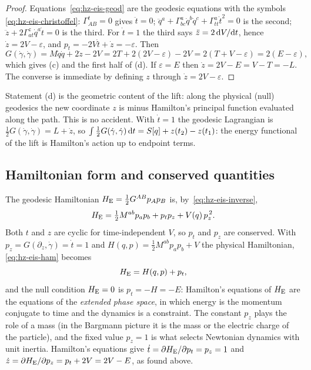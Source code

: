 \begin{proof}
Equations~\eqref{eq:hz-eis-geod} are the geodesic equations with the symbols
\eqref{eq:hz-eis-christoffel}: $\Gamma^t_{AB}=0$ gives $\ddot t=0$;
$\ddot q^a+\Gamma^a_{bc}\dot q^b\dot q^c+\Gamma^a_{tt}\dot t^2=0$ is the second;
$\ddot z+2\Gamma^z_{at}\dot q^a\dot t=0$ is the third. For $\dot t=1$ the third says
$\ddot z=2\,\mathrm{d} V/\mathrm{d} t$, hence $\dot z=2V-\varepsilon$, and $p_t=-2V\dot t+\dot z=-\varepsilon$.
Then
\[
  G(\dot\gamma,\dot\gamma)=M\dot q\dot q+2\dot z-2V
  =2T+2(2V-\varepsilon)-2V=2(T+V-\varepsilon)=2(E-\varepsilon),
\]
which gives (c) and the first half of (d). If $\varepsilon=E$ then
$\dot z=2V-E=V-T=-L$. The converse is immediate by defining
$z$ through $\dot z=2V-\varepsilon$.
\end{proof}

\begin{remark}\label{rem:hz-z-action}
Statement (d) is the geometric content of the lift: along the physical
(null) geodesics the new coordinate $z$ is minus Hamilton's principal
function evaluated along the path. This is no accident. With $\dot t=1$ the
geodesic Lagrangian is $\tfrac12G(\dot\gamma,\dot\gamma)=L+\dot z$, so
$\int\tfrac12G(\dot\gamma,\dot\gamma)\,\mathrm{d} t=S[q]+z(t_2)-z(t_1)$:
the energy functional of the lift is Hamilton's action up to endpoint terms.
\end{remark}

\subsection{Hamiltonian form and conserved quantities}

The geodesic Hamiltonian $H_{\rm E}=\tfrac12G^{AB}p_Ap_B$ is, by~\eqref{eq:hz-eis-inverse},
\begin{equation}\label{eq:hz-eis-ham}
  H_{\rm E}=\tfrac12M^{ab}p_ap_b+p_tp_z+V(q)\,p_z^{\,2}.
\end{equation}
Both $t$ and $z$ are cyclic for time-independent $V$, so $p_t$ and $p_z$ are conserved.
With $p_z=G(\partial_z,\dot\gamma)=\dot t=1$ and
$H(q,p)=\tfrac12M^{ab}p_ap_b+V$ the physical Hamiltonian, \eqref{eq:hz-eis-ham} becomes
\[
  H_{\rm E}=H(q,p)+p_t ,
\]
and the null condition $H_{\rm E}=0$ is $p_t=-H=-E$: Hamilton's equations of $H_{\rm E}$
are the equations of the \emph{extended phase space}, in which energy is the momentum conjugate
to time and the dynamics is a constraint. The constant $p_z$ plays the role of a mass
(in the Bargmann picture it is the mass or the electric charge of the particle), and the
fixed value $p_z=1$ is what selects Newtonian dynamics with unit
inertia. Hamilton's equations give $\dot t=\partial H_{\rm E}/\partial p_t=p_z=1$ and
$\dot z=\partial H_{\rm E}/\partial p_z=p_t+2V=2V-E$, as found above.

